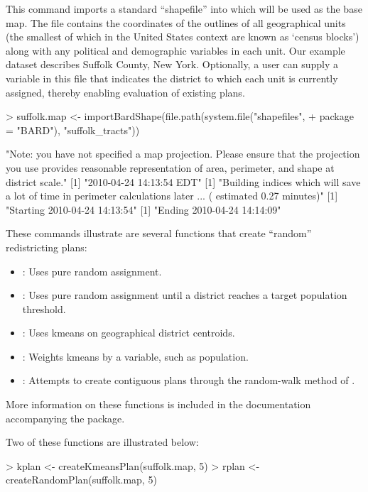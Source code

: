 \documentclass[article]{JSSstyle/jss}
\begin{document}
This command imports a standard ``shapefile'' into  which will be used as the base map.
The file contains the coordinates of the outlines of all geographical units (the smallest of which in the United States context are known as `census blocks') along with any political and demographic variables in each unit. Our example dataset describes Suffolk County, New York. Optionally, a user can supply a variable in this file that indicates the district to which each unit is currently assigned, thereby enabling evaluation of existing plans. 

\begin{Schunk}
\begin{Sinput}
> suffolk.map <- importBardShape(file.path(system.file("shapefiles", 
+     package = "BARD"), "suffolk_tracts"))
\end{Sinput}
\begin{Soutput}
[1] "Note: you have not specified a map projection. Please ensure that the projection you use provides reasonable representation of area, perimeter, and shape at district scale."
[1] "2010-04-24 14:13:54 EDT"
[1] "Building indices which will save a lot of time in perimeter calculations later ... ( estimated  0.27  minutes)"
[1] "Starting 2010-04-24 14:13:54"
[1] "Ending 2010-04-24 14:14:09"
\end{Soutput}
\end{Schunk}

These commands illustrate are several  functions that create ``random'' redistricting plans:
\begin{itemize}
	\item {}: Uses pure random assignment.
	\item {}: Uses pure random assignment until a district reaches a target population threshold.
	\item {}: Uses kmeans on geographical district centroids.
	\item {}: Weights kmeans by a variable, such as population.
	\item {}: Attempts to create contiguous plans through the random-walk method of \citet{CirDarOro00}.
\end{itemize}
More information on these functions is included in the documentation accompanying the package.

Two of these functions are illustrated below:
\begin{Schunk}
\begin{Sinput}
> kplan <- createKmeansPlan(suffolk.map, 5)
> rplan <- createRandomPlan(suffolk.map, 5)
\end{Sinput}
\end{Schunk}
\end{document}
